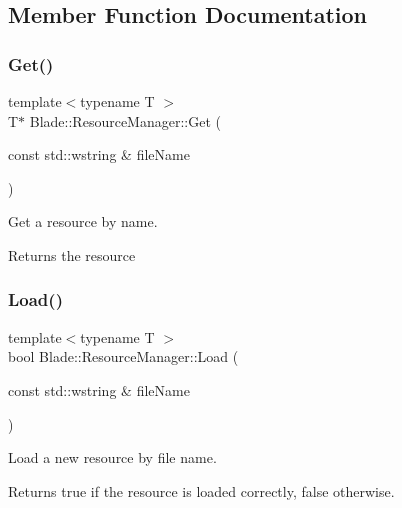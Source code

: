 \subsection{Member Function Documentation}
\mbox{\label{class_blade_1_1_resource_manager_a84e678264f844a6b4bca8d46ee16336b}} 
\subsubsection{\texorpdfstring{Get()}{Get()}}
{\footnotesize\ttfamily template$<$typename T $>$ \\
T$\ast$ Blade\+::\+Resource\+Manager\+::\+Get (\begin{DoxyParamCaption}\item[{const std\+::wstring \&}]{file\+Name }\end{DoxyParamCaption})\hspace{0.3cm}{\ttfamily [inline]}}



Get a resource by name. 

\begin{DoxyReturn}{Returns}
the resource 
\end{DoxyReturn}
\mbox{\label{class_blade_1_1_resource_manager_ad99695e0e3d6cf66e3645b61dcede9b8}} 
\subsubsection{\texorpdfstring{Load()}{Load()}}
{\footnotesize\ttfamily template$<$typename T $>$ \\
bool Blade\+::\+Resource\+Manager\+::\+Load (\begin{DoxyParamCaption}\item[{const std\+::wstring \&}]{file\+Name }\end{DoxyParamCaption})\hspace{0.3cm}{\ttfamily [inline]}}



Load a new resource by file name. 

\begin{DoxyReturn}{Returns}
true if the resource is loaded correctly, false otherwise. 
\end{DoxyReturn}
\mbox{\label{class_blade_1_1_resource_manager_aa406f90716a7758669b424a290549256}} 
